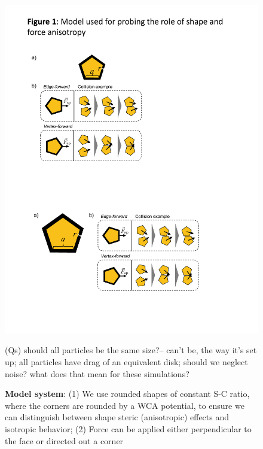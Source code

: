 \begin{figure}[t]
\begin{center}
\includegraphics[width=5in]{../figures/Fig1.pdf}
\caption{\textbf{Model system}: (1) We use rounded shapes of constant S-C ratio, where the corners are rounded by a WCA potential, to ensure we can distinguish between shape steric (anisotropic) effects and isotropic behavior; (2) Force can be applied either perpendicular to the face or directed out a corner}
(Qs) should all particles be the same size?-- can't be, the way it's set up; all particles have drag of an equivalent disk; should we neglect noise? what does that mean for these simulations?
\label{fig:model}
\end{center}
\end{figure}


